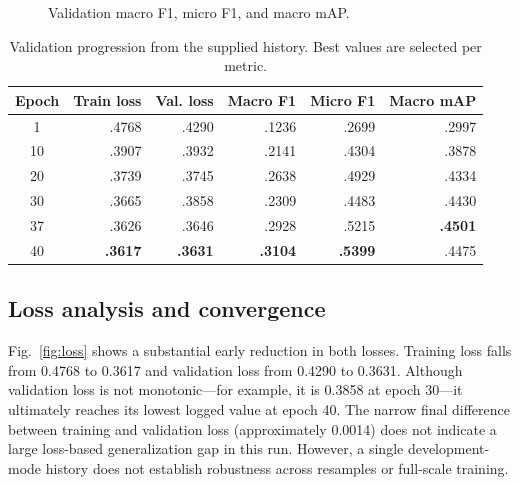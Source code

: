 \documentclass[conference]{IEEEtran}
\begin{document}
\begin{figure}[t]
\centering
{}
\caption{Validation macro F1, micro F1, and macro mAP.}
\label{fig:metrics}
\end{figure}

\begin{table}[t]
\caption{Validation progression from the supplied history. Best values are selected per metric.}
\label{tab:results}
\centering\scriptsize
\begin{tabular}{crrrrr}
\toprule
Epoch & Train loss & Val. loss & Macro F1 & Micro F1 & Macro mAP \\
\midrule
1  & .4768 & .4290 & .1236 & .2699 & .2997 \\
10 & .3907 & .3932 & .2141 & .4304 & .3878 \\
20 & .3739 & .3745 & .2638 & .4929 & .4334 \\
30 & .3665 & .3858 & .2309 & .4483 & .4430 \\
37 & .3626 & .3646 & .2928 & .5215 & \textbf{.4501} \\
40 & \textbf{.3617} & \textbf{.3631} & \textbf{.3104} & \textbf{.5399} & .4475 \\
\bottomrule
\end{tabular}
\end{table}

\subsection{Loss analysis and convergence}
Fig.~\ref{fig:loss} shows a substantial early reduction in both losses. Training loss falls from 0.4768 to 0.3617 and validation loss from 0.4290 to 0.3631. Although validation loss is not monotonic---for example, it is 0.3858 at epoch 30---it ultimately reaches its lowest logged value at epoch 40. The narrow final difference between training and validation loss (approximately 0.0014) does not indicate a large loss-based generalization gap in this run. However, a single development-mode history does not establish robustness across resamples or full-scale training.
\end{document}
